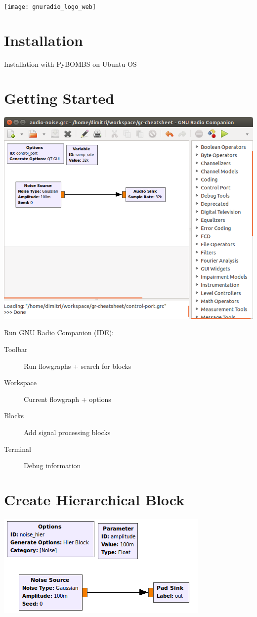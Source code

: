 \documentclass[10pt]{article}
\begin{document}
\texttt{[image: gnuradio\_logo\_web]}


\begin{multicols*}{3}


\section*{Installation}
Installation with PyBOMBS on Ubuntu OS


\section*{Getting Started}

\includegraphics[width=0.99\linewidth]{./grc-screenshot}

Run GNU Radio Companion (IDE):
\begin{description}
\item[Toolbar] Run flowgraphs + search for blocks
\item[Workspace] Current flowgraph + options
\item[Blocks] Add signal processing blocks
\item[Terminal] Debug information
\end{description}

\section*{Create Hierarchical Block}

\includegraphics[width=0.99\linewidth]{./noise-hier.png}


\end{multicols*}
\end{document}
